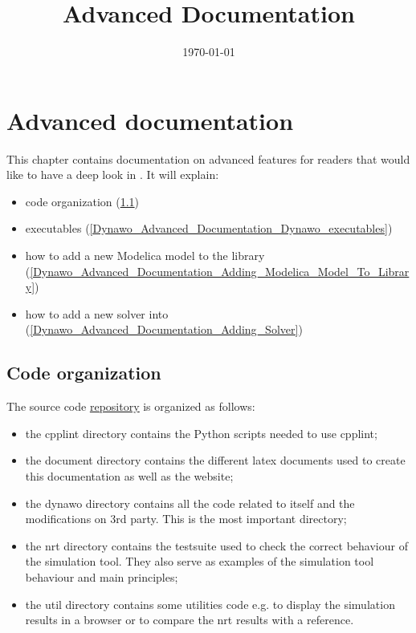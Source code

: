 \documentclass[a4paper, 12pt]{report}
\begin{document}
\title{\Dynawo Advanced Documentation}
\date\today

\maketitle
\tableofcontents

\chapter{Advanced documentation}

This chapter contains documentation on advanced features for readers that would like to have a deep look in \Dynawo. It will explain:
\begin{itemize}
\item \Dynawo code organization (\ref{Dynawo_Advanced_Documentation_Code_Organization})
\item \Dynawo executables
(\ref{Dynawo_Advanced_Documentation_Dynawo_executables})
\item how to add a new Modelica model to the library (\ref{Dynawo_Advanced_Documentation_Adding_Modelica_Model_To_Library})
\item how to add a new solver into \Dynawo (\ref{Dynawo_Advanced_Documentation_Adding_Solver})
\end{itemize}

\section{Code organization}
\label{Dynawo_Advanced_Documentation_Code_Organization}

The \Dynawo source code \href{https://github.com/dynawo/dynawo.git}
{\underline{repository}} is organized as follows:
\begin{itemize}
\item the cpplint directory contains the Python scripts needed to use cpplint;
\item the document directory contains the different latex documents used to
create this documentation as well as the \Dynawo website;
\item the dynawo directory contains all the code related to \Dynawo itself and
the modifications on 3rd party. This is the most important directory;
\item the nrt directory contains the testsuite used to check the correct
behaviour of the simulation tool. They also serve as examples of the simulation
tool behaviour and main principles;
\item the util directory contains some utilities code e.g. to display the
simulation results in a browser or to compare the nrt
results with a reference.
\end{itemize}
\end{document}
